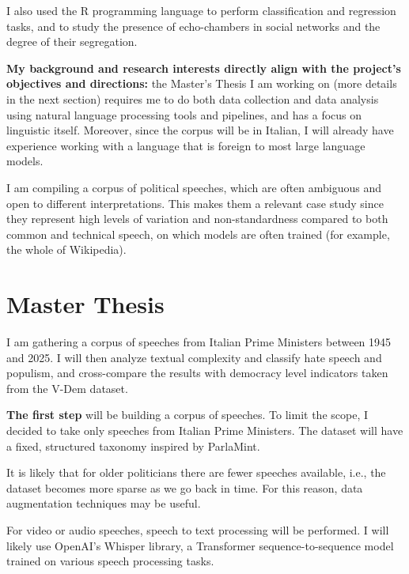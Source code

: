 \documentclass[12pt,a4paper,sans]{moderncv} %
\begin{document}
I also used the R programming language to perform classification and regression tasks, and to study the presence of echo-chambers in social networks and the degree of their segregation.

\vspace{2mm}

\textbf{My background and research interests directly align with the project's objectives and directions:} the Master's Thesis I am working on (more details in the next section) requires me to do both data collection and data analysis using natural language processing tools and pipelines, and has a focus on linguistic itself. Moreover, since the corpus will be in Italian, I will already have experience working with a language that is foreign to most large language models.

I am compiling a corpus of political speeches, which are often ambiguous and open to different interpretations. This makes them a relevant case study since they represent high levels of variation and non-standardness compared to both common and technical speech, on which models are often trained (for example, the whole of Wikipedia). 

\section{Master Thesis}
 
I am gathering a corpus of speeches from Italian Prime Ministers between 1945 and 2025. I will then analyze textual complexity and classify hate speech and populism, and cross-compare the results with democracy level indicators taken from the V-Dem dataset.

\vspace{2mm}

\textbf{The first step} will be building a corpus of speeches. To limit the scope, I decided to take only speeches from Italian Prime Ministers. The dataset will have a fixed, structured taxonomy inspired by ParlaMint.

It is likely that for older politicians there are fewer speeches available, i.e., the dataset becomes more sparse as we go back in time. For this reason, data augmentation techniques may be useful.

For video or audio speeches, speech to text processing will be performed. I will likely use OpenAI's Whisper library, a Transformer sequence-to-sequence model trained on various speech processing tasks. 
\end{document}
